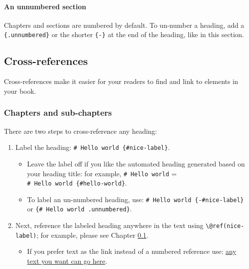 \documentclass[
]{bxjsbook}
\providecommand{\tightlist}{%
  \setlength{\itemsep}{0pt}\setlength{\parskip}{0pt}}
\theoremstyle{definition}
\theoremstyle{definition}
\theoremstyle{definition}
\theoremstyle{definition}
\theoremstyle{remark}
\begin{document}
\hypertarget{an-unnumbered-section}{%
\paragraph*{An unnumbered section}\label{an-unnumbered-section}}

Chapters and sections are numbered by default. To un-number a heading, add a \texttt{\{.unnumbered\}} or the shorter \texttt{\{-\}} at the end of the heading, like in this section.

\hypertarget{cross}{%
\subsection{Cross-references}\label{cross}}

Cross-references make it easier for your readers to find and link to elements in your book.

\hypertarget{chapters-and-sub-chapters}{%
\subsubsection{Chapters and sub-chapters}\label{chapters-and-sub-chapters}}

There are two steps to cross-reference any heading:

\begin{enumerate}
\def\labelenumi{\arabic{enumi}.}
\tightlist
\item
  Label the heading: \texttt{\#\ Hello\ world\ \{\#nice-label\}}.

  \begin{itemize}
  \tightlist
  \item
    Leave the label off if you like the automated heading generated based on your heading title: for example, \texttt{\#\ Hello\ world} = \texttt{\#\ Hello\ world\ \{\#hello-world\}}.
  \item
    To label an un-numbered heading, use: \texttt{\#\ Hello\ world\ \{-\#nice-label\}} or \texttt{\{\#\ Hello\ world\ .unnumbered\}}.
  \end{itemize}
\item
  Next, reference the labeled heading anywhere in the text using \texttt{\textbackslash{}@ref(nice-label)}; for example, please see Chapter \ref{cross}.

  \begin{itemize}
  \tightlist
  \item
    If you prefer text as the link instead of a numbered reference use: \protect\hyperlink{cross}{any text you want can go here}.
  \end{itemize}
\end{enumerate}
\end{document}
